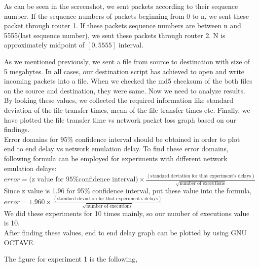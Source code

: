 \documentclass[conference]{IEEEtran}
\begin{document}
As can be seen in the screenshot, we sent packets according to their sequence number. If the sequence numbers of packets beginning from 0 to n, we sent these packet through router 1. If these packets sequence numbers are between n and 5555(last sequence number), we sent these packets through router 2. N is approximately midpoint of $[0,5555]$ interval.

As we mentioned previously, we sent a file from source to destination with size of 5 megabytes. In all cases, our destination script has achieved to open and write incoming packets into a file. When we checked the md5 checksum of the both files on the source and destination, they were same. Now we need to analyze results.  By looking these values, we collected the required information like standard deviation of the file transfer times, mean of the file transfer times etc. Finally, we have plotted the file transfer time vs network packet loss graph based on our findings. \\
Error domains for 95\% confidence interval should be obtained in order to plot end to end delay vs network emulation delay. To find these error domains, following formula can be employed for experiments with different network emulation delays: \\

$error = (\text{z value for 95\% confidence interval)} \times \frac{(\text{standard deviation for that experiment's delays})}{\sqrt{\text{number of executions}}} $\\

Since z value is 1.96 for 95\% confidence interval, put these value into the formula,\\

$error = 1.960 \times \frac{(\text{standard deviation for that experiment's delays})}{\sqrt{\text{number of executions}}} $\\

We did these experiments for 10 times mainly, so our number of executions value is 10.\\
After finding these values, end to end delay graph can be plotted by using GNU OCTAVE.

The figure for experiment 1 is the following,\\
\end{document}
